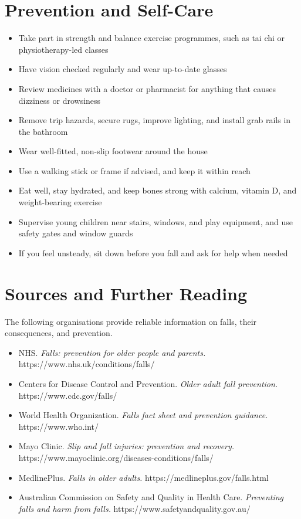 \section*{Prevention and Self-Care}
\begin{itemize}
    \item Take part in strength and balance exercise programmes, such as tai chi or physiotherapy-led classes
    \item Have vision checked regularly and wear up-to-date glasses
    \item Review medicines with a doctor or pharmacist for anything that causes dizziness or drowsiness
    \item Remove trip hazards, secure rugs, improve lighting, and install grab rails in the bathroom
    \item Wear well-fitted, non-slip footwear around the house
    \item Use a walking stick or frame if advised, and keep it within reach
    \item Eat well, stay hydrated, and keep bones strong with calcium, vitamin D, and weight-bearing exercise
    \item Supervise young children near stairs, windows, and play equipment, and use safety gates and window guards
    \item If you feel unsteady, sit down before you fall and ask for help when needed
\end{itemize}

\section*{Sources and Further Reading}
The following organisations provide reliable information on falls, their consequences, and prevention.

\begin{itemize}
    \item NHS. \textit{Falls: prevention for older people and parents.} https://www.nhs.uk/conditions/falls/
    \item Centers for Disease Control and Prevention. \textit{Older adult fall prevention.} https://www.cdc.gov/falls/
    \item World Health Organization. \textit{Falls fact sheet and prevention guidance.} https://www.who.int/
    \item Mayo Clinic. \textit{Slip and fall injuries: prevention and recovery.} https://www.mayoclinic.org/diseases-conditions/falls/
    \item MedlinePlus. \textit{Falls in older adults.} https://medlineplus.gov/falls.html
    \item Australian Commission on Safety and Quality in Health Care. \textit{Preventing falls and harm from falls.} https://www.safetyandquality.gov.au/
\end{itemize}
